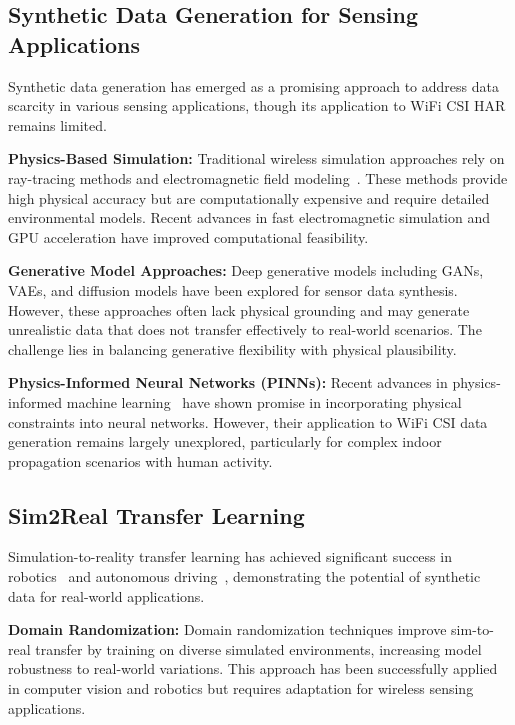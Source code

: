 \subsection{Synthetic Data Generation for Sensing Applications}

Synthetic data generation has emerged as a promising approach to address data scarcity in various sensing applications, though its application to WiFi CSI HAR remains limited.

\textbf{Physics-Based Simulation:} Traditional wireless simulation approaches rely on ray-tracing methods and electromagnetic field modeling~\cite{ray_tracing_wireless2000}. These methods provide high physical accuracy but are computationally expensive and require detailed environmental models. Recent advances in fast electromagnetic simulation and GPU acceleration have improved computational feasibility.

\textbf{Generative Model Approaches:} Deep generative models including GANs, VAEs, and diffusion models have been explored for sensor data synthesis. However, these approaches often lack physical grounding and may generate unrealistic data that does not transfer effectively to real-world scenarios. The challenge lies in balancing generative flexibility with physical plausibility.

\textbf{Physics-Informed Neural Networks (PINNs):} Recent advances in physics-informed machine learning~\cite{pinn_karniadakis2021} have shown promise in incorporating physical constraints into neural networks. However, their application to WiFi CSI data generation remains largely unexplored, particularly for complex indoor propagation scenarios with human activity.

\subsection{Sim2Real Transfer Learning}

Simulation-to-reality transfer learning has achieved significant success in robotics~\cite{sim2real_robotics2017} and autonomous driving~\cite{sim2real_autonomous2019}, demonstrating the potential of synthetic data for real-world applications.

\textbf{Domain Randomization:} Domain randomization techniques improve sim-to-real transfer by training on diverse simulated environments, increasing model robustness to real-world variations. This approach has been successfully applied in computer vision and robotics but requires adaptation for wireless sensing applications.

